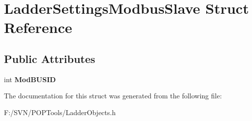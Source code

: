 \hypertarget{struct_ladder_settings_modbus_slave}{\section{Ladder\-Settings\-Modbus\-Slave Struct Reference}
\label{struct_ladder_settings_modbus_slave}
}
\subsection*{Public Attributes}
\begin{DoxyCompactItemize}
\item 
\hypertarget{struct_ladder_settings_modbus_slave_a8d15bd9e94a46fe612b402bab2dc0ce4}{int {\bfseries Mod\-B\-U\-S\-I\-D}}\label{struct_ladder_settings_modbus_slave_a8d15bd9e94a46fe612b402bab2dc0ce4}

\end{DoxyCompactItemize}


The documentation for this struct was generated from the following file\-:\begin{DoxyCompactItemize}
\item 
F\-:/\-S\-V\-N/\-P\-O\-P\-Tools/Ladder\-Objects.\-h\end{DoxyCompactItemize}
